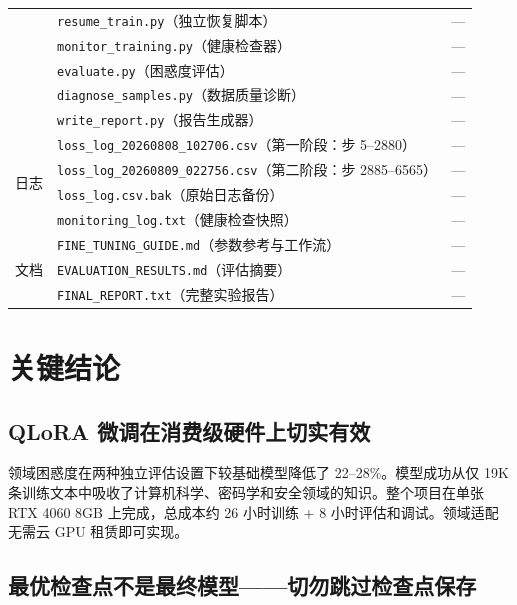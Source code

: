 \documentclass[12pt,a4paper]{ctexart}
\begin{document}
\begin{table}[htbp]
\begin{tabular}{@{}llr@{}}
                      & \texttt{resume\_train.py}（独立恢复脚本）& --- \\
                      & \texttt{monitor\_training.py}（健康检查器）& --- \\
                      & \texttt{evaluate.py}（困惑度评估）& --- \\
                      & \texttt{diagnose\_samples.py}（数据质量诊断）& --- \\
                      & \texttt{write\_report.py}（报告生成器）& --- \\
\midrule
\multirow{4}{*}{日志} & \texttt{loss\_log\_20260808\_102706.csv}（第一阶段：步 5--2880）& --- \\
                      & \texttt{loss\_log\_20260809\_022756.csv}（第二阶段：步 2885--6565）& --- \\
                      & \texttt{loss\_log.csv.bak}（原始日志备份）& --- \\
                      & \texttt{monitoring\_log.txt}（健康检查快照）& --- \\
\midrule
\multirow{3}{*}{文档} & \texttt{FINE\_TUNING\_GUIDE.md}（参数参考与工作流）& --- \\
                      & \texttt{EVALUATION\_RESULTS.md}（评估摘要）& --- \\
                      & \texttt{FINAL\_REPORT.txt}（完整实验报告）& --- \\
\bottomrule
\end{tabular}
\end{table}

\section{关键结论}

\subsection{QLoRA 微调在消费级硬件上切实有效}

领域困惑度在两种独立评估设置下较基础模型降低了 22--28\%。模型成功从仅 19K 条训练文本中吸收了计算机科学、密码学和安全领域的知识。整个项目在单张 RTX 4060 8GB 上完成，总成本约 26 小时训练 + 8 小时评估和调试。领域适配无需云 GPU 租赁即可实现。

\subsection{最优检查点不是最终模型——切勿跳过检查点保存}
\end{document}
